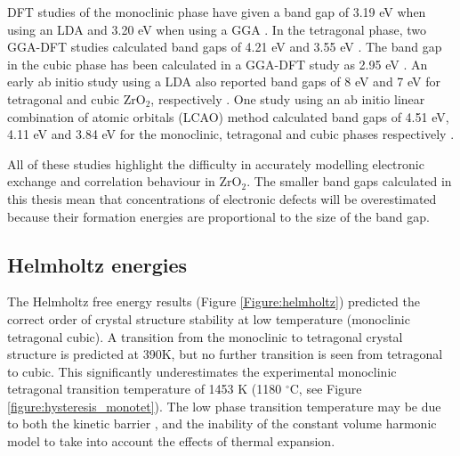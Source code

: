 DFT studies of the monoclinic phase have given a band gap of 3.19 eV when using an LDA \cite{Foster2002} and 3.20 eV when using a GGA \cite{Jaffe2005}. In the tetragonal phase, two GGA-DFT studies calculated band gaps of 4.21 eV \cite{Eichler2001} and 3.55 eV \cite{Jaffe2005}. The band gap in the cubic phase has been calculated in a GGA-DFT study as 2.95 eV \cite{Jaffe2005}. An early ab initio study using a LDA also reported band gaps of 8 eV and 7 eV for tetragonal and cubic ZrO$_{2}$, respectively \cite{morinaga1983electronic}. One study using an ab initio linear combination of atomic orbitals (LCAO) method calculated band gaps of 4.51 eV, 4.11 eV and 3.84 eV for the monoclinic, tetragonal and cubic phases respectively \cite{Zandiehnadem1988}.

All of these studies highlight the difficulty in accurately modelling electronic exchange and correlation behaviour in ZrO$_{2}$. The smaller band gaps calculated in this thesis mean that concentrations of electronic defects will be overestimated because their formation energies are proportional to the size of the band gap. 

\subsection{Helmholtz energies}

The Helmholtz free energy results (Figure \ref{Figure:helmholtz}) predicted the correct order of crystal structure stability at low temperature (monoclinic \textrightarrow tetragonal \textrightarrow cubic). A transition from the monoclinic to tetragonal crystal structure is predicted at 390K, but no further transition is seen from tetragonal to cubic. This significantly underestimates the experimental monoclinic \textrightarrow tetragonal transition temperature of 1453 K (1180 $^{\circ}$C, see Figure \ref{figure:hysteresis_monotet}). The low phase transition temperature may be due to both the kinetic barrier \cite{bansal1972martensitic,bansal1974martensitic}, and the inability of the constant volume harmonic model to take into account the effects of thermal expansion. 

